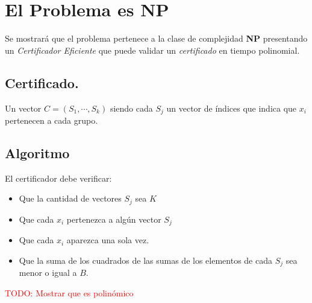 \section{El Problema es NP}
Se mostrará que el problema pertenece a la clase de complejidad \textbf{NP}
presentando un \textit{Certificador Eficiente} que puede validar un
\textit{certificado} en tiempo polinomial.

\subsection*{Certificado.}
Un vector $C=(S_{1},\cdots,S_{k})$ siendo cada $S_{j}$ un vector de índices
que indica que $x_{i}$ pertenecen a cada grupo.
\subsection{Algoritmo}
El certificador debe verificar:
\begin{itemize}
    \item Que la cantidad de vectores $S_{j}$ sea $K$
    \item Que cada $x_{i}$ pertenezca a algún vector $S_{j}$
    \item Que cada $x_{i}$ aparezca una sola vez.
    \item Que la suma de los cuadrados de las sumas de los elementos de cada
    $S_{j}$ sea menor o igual a $B$.
\end{itemize}

\textcolor{red}{TODO: Mostrar que es polinómico}